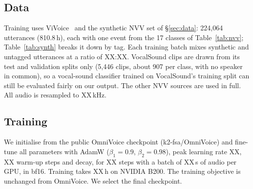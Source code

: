 \documentclass{article} %
\begin{document}
\subsection{Data}\label{sec:exp-data}
Training uses ViVoice~\citep{vivoice} and the synthetic NVV set of \S\ref{sec:data}: 224,064
utterances (810.8\,h), each with one event from the 17 classes of Table~\ref{tab:nvv};
Table~\ref{tab:synth} breaks it down by tag. Each training batch mixes synthetic and untagged
utterances at a ratio of XX:XX. VocalSound clips are drawn from its test and validation splits
only (5,446 clips, about 907 per class, with no speaker in common), so a vocal-sound classifier
trained on VocalSound's training split can still be evaluated fairly on our output. The other
NVV sources are used in full. All
audio is resampled to XX\,kHz.

\begin{table}[H]
\caption{Synthetic NVV training set per tag, after quality filtering. Each utterance carries
one event. Hours are the total duration of the finished utterances.}
\label{tab:synth}
\centering

\end{table}

\subsection{Training}
We initialise from the public OmniVoice checkpoint (k2-fsa/OmniVoice) and fine-tune
all parameters with AdamW ($\beta_1{=}0.9$, $\beta_2{=}0.98$), peak learning rate XX, XX warm-up steps
and %
decay, for XX steps with a batch of XX\,s of audio per GPU, in bf16. Training takes XX\,h
on NVIDIA B200. The training objective is unchanged from OmniVoice. We select the final checkpoint.
\end{document}
